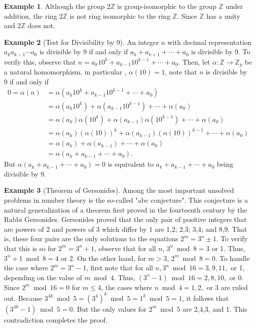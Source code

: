 \documentclass{article}
\theoremstyle{definition}
\newtheorem{example}{Example}[section]
\begin{document}
\begin{example}
    Although the group $2\mathbb{Z}$ is group-isomorphic to the group $\mathbb{Z}$ under addition, the ring $2\mathbb{Z}$ is not ring isomorphic to the ring $\mathbb{Z}$. Since $\mathbb{Z}$ has a unity and $2\mathbb{Z}$ does not. 
\end{example}

\begin{example}[Test for Divisibility by 9]
    An integer $n$ with decimal representation $a_ka_{k-1}\cdots a_0$ is divisible by 9 if and only if $a_k+a_{k+1}+\cdots+a_0$ is divisible by 9. To verify this, observe that $n=a_k10^k+a_{k-1}10^{k-1}+\cdots+a_0$. Then, let $\alpha:\mathbb{Z}\to \mathbb{Z}_p$ be a natural homomorphism, in particular , $\alpha(10)=1$, note that $n$ is divisible by 9 if and only if 
    \begin{align*}
        0=\alpha(n)&=\alpha(a_k10^k+a_{k-1}10^{k-1}+\cdots+a_0)\\
        &=\alpha(a_k10^k)+\alpha(a_{k-1}10^{k-1})+\cdots+\alpha(a_0)\\
        &=\alpha(a_k)\alpha(10^k)+\alpha(a_{k-1})\alpha(10^{k-1})+\cdots+\alpha(a_0)\\
        &=\alpha(a_k)(\alpha(10))^k+\alpha(a_{k-1})(\alpha(10))^{k-1}+\cdots+\alpha(a_0)\\
        &=\alpha(a_k)+\alpha(a_{k-1})+\cdots+\alpha(a_0)\\
        &=\alpha(a_k+a_{k-1}+\cdots+a_0).
    \end{align*}
    But $\alpha(a_k+a_{k-1}+\cdots+a_0)=0$ is equivalent to $a_k+a_{k-1}+\cdots+a_0$ being divisible by 9.
\end{example}

\begin{example}[Theorem of Gersonides]
    Among the most important unsolved problems in number theory is the so-called "abc conjecture". This conjecture is a natural generalization of a theorem first proved in the fourteenth century by the Rabbi Gersonides. Gersonides proved that the only pair of positive integers that are powers of 2 and powers of 3 which differ by 1 are 1,2; 2,3; 3,4; and 8,9. That is, these four pairs are the only solutions to the equations $2^m=3^n\pm 1$. To verify that this is so for $2^m=3^n+1$, observe that for all $n$, $3^n\bmod8=3$ or 1. Thus, $3^n+1\bmod8=4$ or 2. On the other hand, for $m>3$, $2^m\bmod8=0$. To handle the case where $2^m=3^n-1$, first note that for all $n,3^n\bmod16=3,9,11,$ or 1, depending on the value of $m\bmod4$. Thus, $(3^n-1)\bmod16=2,8,10,$ or 0. Since $2^m\bmod16=0$ for $m\leq4$, the cases where $n\bmod4=1,2,$ or 3 are ruled out. Because $3^{4k}\bmod5=(3^4)^k\bmod5=1^k\bmod5=1$, it follows that $(3^{4k}-1)\bmod5=0$. But the only values for $2^m\bmod5$ are 2,4,3, and 1. This contradiction completes the proof. 
\end{example}
\end{document}
